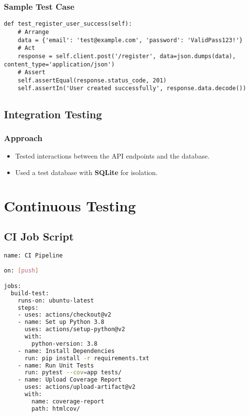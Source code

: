 \documentclass[12pt,a4paper]{report}
\begin{document}
\subsection{Sample Test Case}
\begin{lstlisting}[caption=Sample Unit Test for Registration Function]
def test_register_user_success(self):
    # Arrange
    data = {'email': 'test@example.com', 'password': 'ValidPass123!'}
    # Act
    response = self.client.post('/register', data=json.dumps(data), content_type='application/json')
    # Assert
    self.assertEqual(response.status_code, 201)
    self.assertIn('User created successfully', response.data.decode())
\end{lstlisting}

\section{Integration Testing}
\subsection{Approach}
\begin{itemize}
    \item Tested interactions between the API endpoints and the database.
    \item Used a test database with \textbf{SQLite} for isolation.
\end{itemize}

\chapter{Continuous Testing}
\section{CI Job Script}
\begin{lstlisting}[language=bash,caption=GitHub Actions CI Pipeline Script]
name: CI Pipeline

on: [push]

jobs:
  build-test:
    runs-on: ubuntu-latest
    steps:
    - uses: actions/checkout@v2
    - name: Set up Python 3.8
      uses: actions/setup-python@v2
      with:
        python-version: 3.8
    - name: Install Dependencies
      run: pip install -r requirements.txt
    - name: Run Unit Tests
      run: pytest --cov=app tests/
    - name: Upload Coverage Report
      uses: actions/upload-artifact@v2
      with:
        name: coverage-report
        path: htmlcov/
\end{lstlisting}
\end{document}
